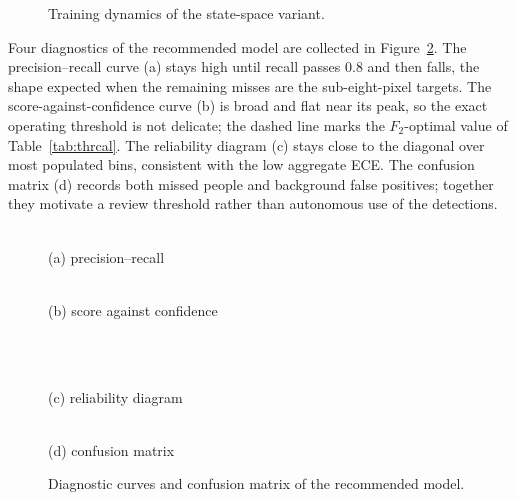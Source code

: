 \begin{figure}[tbp]
  \centering
  \caption{Training dynamics of the state-space variant.}
  \label{fig:training}
\end{figure}

Four diagnostics of the recommended model are collected in
Figure~\ref{fig:diag}. The precision--recall curve (a) stays high until
recall passes $0.8$ and then falls, the shape expected when the remaining
misses are the sub-eight-pixel targets. The score-against-confidence curve
(b) is broad and flat near its peak, so the exact operating threshold is not
delicate; the dashed line marks the $F_2$-optimal value of
Table~\ref{tab:thrcal}. The reliability diagram (c) stays close to the
diagonal over most populated bins, consistent with the low aggregate ECE.
The confusion matrix (d) records both missed people and background false
positives; together they motivate a review threshold rather than autonomous
use of the detections.

\begin{figure}[tbp]
  \centering
  \begin{minipage}[t]{0.49\linewidth}\centering
    \\[2pt]
    {\small (a) precision--recall}
  \end{minipage}\hfill
  \begin{minipage}[t]{0.49\linewidth}\centering
    \\[2pt]
    {\small (b) score against confidence}
  \end{minipage}\\[6pt]
  \begin{minipage}[t]{0.49\linewidth}\centering
    \\[2pt]
    {\small (c) reliability diagram}
  \end{minipage}\hfill
  \begin{minipage}[t]{0.49\linewidth}\centering
    \\[2pt]
    {\small (d) confusion matrix}
  \end{minipage}
  \caption{Diagnostic curves and confusion matrix of the recommended model.}
  \label{fig:diag}
\end{figure}

